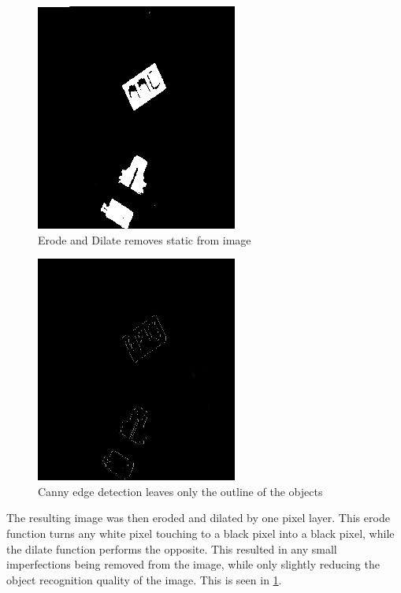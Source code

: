 \documentclass[11pt,a4paper]{report}
\begin{document}
\begin{figure}
	\centering
	\includegraphics[width=0.6\linewidth]{out4}
	\caption{Erode and Dilate removes static from image}
	\label{fig:out4}
\end{figure}
\begin{figure}
	\centering
	\includegraphics[width=0.6\linewidth]{out3}
	\caption{Canny edge detection leaves only the outline of the objects}
	\label{fig:out3}
\end{figure}
The resulting image was then eroded and dilated by one pixel layer. This erode function turns any white pixel touching to a black pixel into a black pixel, while the dilate function performs the opposite. This resulted in any small imperfections being removed from the image, while only slightly reducing the object recognition quality of the image. This is seen in \cref{fig:out4}.
\end{document}
